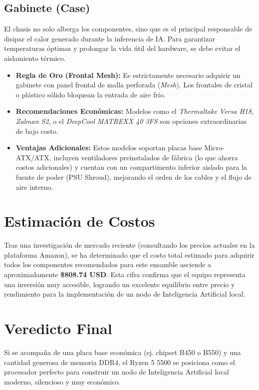 \documentclass[12pt,a4paper]{article}
\begin{document}
\subsection{Gabinete (Case)}
El chasis no solo alberga los componentes, sino que es el principal responsable de disipar el calor generado durante la inferencia de IA. Para garantizar temperaturas óptimas y prolongar la vida útil del hardware, se debe evitar el aislamiento térmico.
\begin{itemize}
    \item \textbf{Regla de Oro (Frontal Mesh):} Es estrictamente necesario adquirir un gabinete con panel frontal de malla perforada (\textit{Mesh}). Los frontales de cristal o plástico sólido bloquean la entrada de aire frío.
    \item \textbf{Recomendaciones Económicas:} Modelos como el \textit{Thermaltake Versa H18}, \textit{Zalman S2}, o el \textit{DeepCool MATREXX 40 3FS} son opciones extraordinarias de bajo costo. 
    \item \textbf{Ventajas Adicionales:} Estos modelos soportan placas base Micro-ATX/ATX, incluyen ventiladores preinstalados de fábrica (lo que ahorra costos adicionales) y cuentan con un compartimento inferior aislado para la fuente de poder (PSU Shroud), mejorando el orden de los cables y el flujo de aire interno.
\end{itemize}

\section{Estimación de Costos}
Tras una investigación de mercado reciente (consultando los precios actuales en la plataforma Amazon), se ha determinado que el costo total estimado para adquirir todos los componentes recomendados para este ensamble asciende a aproximadamente \textbf{\$808.74 USD}. Esta cifra confirma que el equipo representa una inversión muy accesible, logrando un excelente equilibrio entre precio y rendimiento para la implementación de un nodo de Inteligencia Artificial local.

\section{Veredicto Final}
Si se acompaña de una placa base económica (ej. chipset B450 o B550) y una cantidad generosa de memoria DDR4, el Ryzen 5 5500 se posiciona como el procesador perfecto para construir un nodo de Inteligencia Artificial local moderno, silencioso y muy económico.
\end{document}

